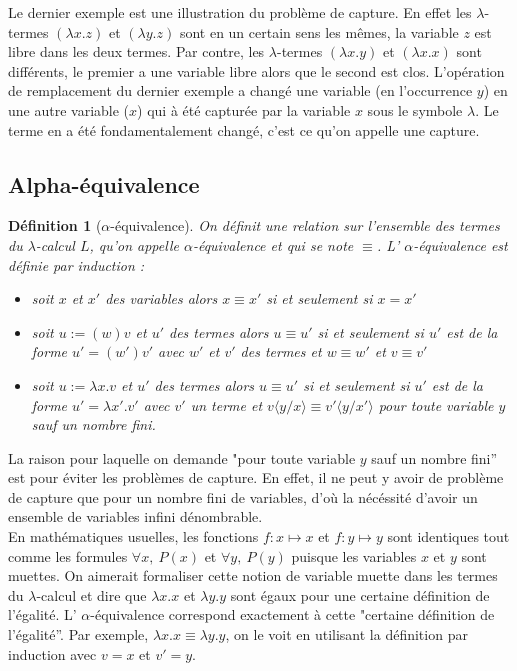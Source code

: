 \documentclass[a4paper,12pt]{article}
\theoremstyle{plain}
\newtheorem{defi}[theo]{Définition}
\begin{document}
Le dernier exemple est une illustration du problème de capture. En effet les $\lambda$-termes $(\lambda x.z)$ et $(\lambda y.z)$ sont en un certain sens les mêmes, la variable $z$ est libre dans les deux termes. Par contre, les $\lambda$-termes $(\lambda x.y)$ et $(\lambda x.x)$ sont différents, le premier a une variable libre alors que le second est clos. L'opération de remplacement du dernier exemple a changé une variable (en l'occurrence $y$) en une autre variable ($x$) qui à été capturée par la variable $x$ sous le symbole $\lambda$. Le terme en a été fondamentalement changé, c'est ce qu'on appelle une capture.

\subsection{Alpha-équivalence}
\label{alpha-equivalence}

\begin{defi}[$\alpha$-équivalence]
On définit une relation sur l'ensemble des termes du $\lambda$-calcul $L$, qu'on appelle $\alpha$-équivalence et qui se note $\equiv$. L' $\alpha$-équivalence est définie par induction :
\begin{itemize}
\setlength\itemsep{ -1.5 em}
\item soit $x$ et $x'$ des variables alors $x \equiv x'$ si et seulement si $x = x'$\\
\item soit $u := (w)v$ et $u'$ des termes alors $u \equiv u'$ si et seulement si $u'$ est de la forme $u' = (w')v'$ avec $w'$ et $v'$ des termes et $w \equiv w'$ et $v \equiv v'$\\
\item soit $u :=  \lambda x.v$ et $u'$ des termes alors $u \equiv u'$ si et seulement si $u'$ est de la forme $u' = \lambda x'.v'$ avec $v'$ un terme et $v \langle y/x \rangle \equiv v' \langle y/x' \rangle$ pour toute variable $y$ sauf un nombre fini.
\end{itemize}
\end{defi}

La raison pour laquelle on demande "pour toute variable $y$ sauf un nombre fini'' est pour éviter les problèmes de capture. En effet, il ne peut y avoir de problème de capture que pour un nombre fini de variables, d'où la nécéssité d'avoir un ensemble de variables infini dénombrable.\\

En mathématiques usuelles, les fonctions $f: x \mapsto x$ et $f: y \mapsto y$ sont identiques tout comme les formules $\forall x, \ P(x)$ et $\forall y, \ P(y)$ puisque les variables $x$ et $y$ sont muettes. On aimerait formaliser cette notion de variable muette dans les termes du $\lambda$-calcul et dire que $\lambda x.x$ et $\lambda y.y$ sont égaux pour une certaine définition de l'égalité. L' $\alpha$-équivalence correspond exactement à cette "certaine définition de l'égalité''. Par exemple, $\lambda x.x \equiv \lambda y.y$, on le voit en utilisant la définition par induction avec $v = x$ et $v' = y$.\\
\end{document}
